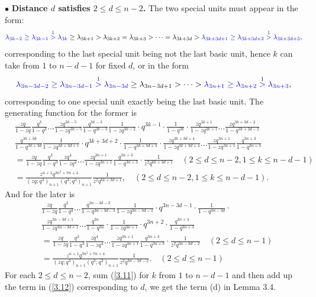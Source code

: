 \documentclass[draft]{amsart}
\numberwithin{equation}{section}
\theoremstyle{plain}
\theoremstyle{remark}
\begin{document}
 
$\bullet$ {\bf Distance $d$ satisfies  $2\leq d\leq n-2$.}
 The two special units must appear in the form:
$$
{\color{blue}\lambda_{3k-2}  \geq \lambda_{3k-1} \overset{1}{>} \lambda_{3k}} \geq  \lambda_{3k+1} > \lambda_{3k+2} = \lambda_{3k+3} > \dots=\lambda_{3k+3d}> {\color{blue}\lambda_{3k+3d+1}\geq\lambda_{3k+3d+2} \overset{1}{>} \lambda_{3k+3d+3}},
$$
corresponding to the last special unit  being not the last basic unit, hence $k$ can take from $1$ to $n-d-1$ for fixed $d$, or in the form
$$
{\color{blue}\lambda_{3n-3d-2}  \geq \lambda_{3n-3d-1} \overset{1}{>} \lambda_{3n-3d}} \geq  \lambda_{3n-3d+1} >\dots > {\color{blue} \lambda_{3n+1} \geq \lambda_{3n+2}\overset{1}{>}  \lambda_{3n+3}},
$$
corresponding to one special unit exactly being the last basic unit. The generating function for the former is
\begin{align}
 &\frac{zq}{1-zq}\frac{q^{3}}{1-q^{3}}\dots\frac{zq^{3k-5}}{1-zq^{3k-5}}\frac{q^{3k-3}}{1-q^{3k-3}}
 \frac{1}{1-zq^{3k-2}}\cdot q^{3k-1}\cdot\frac{1}{1-q^{3k}}\cdot
 \frac{zq^{3k+1}}{1-zq^{3k+1}}\dots\frac{zq^{3k+3d-2}}{1-q^{3k+3d-2}}\nonumber\\
 &\frac{q^{3k+3d}}{1-q^{3k+3d}}
 \frac{1}{1-zq^{3k+3d+1}}\cdot q^{3k+3d+2}\cdot\frac{1}{1-q^{3k+3d+3}}
\cdot\frac{zq^{3k+3d+4}}{1-zq^{3k+3d+4}}\dots\frac{zq^{3n+1}}{1-zq^{3n+1}}\frac{q^{3n+3}}{1-q^{3n+3}}\nonumber\\
&= \frac{zq}{1-zq}\frac{q^{3}}{1-q^{3}} \frac{zq^{4}}{1-zq^{4}}\dots\frac{zq^{3n+1}}{1-zq^{3n+1}} \frac{q^{3n+3}}{1-q^{3n+3}}\cdot\frac{1}{z^{2}q^{6k+3d+1}}  \quad (2 \leq d \leq n-2, 1\leq k \leq n-d-1)\nonumber\\
&=\frac{z^{n+1}q^{3n^{2}+7n+4}}{(zq;q^{3})_{n+1}(q^{3};q^{3})_{n+1}}\frac{1}{z^{2}q^{6k+3d+1}},              \quad(2\leq d\leq n-2,1\leq k\leq n-d-1).\label{3.11}
\end{align}
 And for the later is
\begin{align}
 &\frac{zq}{1-zq}\frac{q^{3}}{1-q^{3}}\dots\frac{q^{3n-3d-3}}{1-q^{3n-3d-3}}
 \frac{1}{1-zq^{3n-3d-2}}\cdot q^{3n-3d-1}\cdot\frac{1}{1-q^{3n-3d}}\cdot\nonumber\\
 &\frac{zq^{3n-3d+1}}{1-zq^{3n-3d+1}}\dots \frac{q^{3n}}{1-q^{3n}}\cdot\frac{1}{1-zq^{3n+1}}\cdot q^{3n+2}\cdot\frac{q^{3n+3}}{1-q^{3n+3}}\nonumber\\
&= \frac{zq}{1-zq}\frac{q^{3}}{1-q^{3}} \frac{zq^{4}}{1-zq^{4}}\dots\frac{zq^{3n+1}}{1-zq^{3n+1}} \frac{q^{3n+3}}{1-q^{3n+3}}\cdot\frac{1}{z^{2}q^{3n-3d-2}}  \quad( 2 \leq d \leq n-1)\nonumber\\
&=\frac{z^{n+1}q^{3n^{2}+7n+4}}{(zq;q^{3})_{n+1}(q^{3};q^{3})_{n+1}}\frac{1}{z^{2}q^{3n-3d-2}}. \quad(2 \leq d\leq n-1)\label{3.12}
\end{align}
For each $2\leq d\leq n-2$, sum (\ref{3.11}) for $k$ from $1$ to $n-d-1$ and then add up the term in (\ref{3.12}) corresponding to $d$, we get the term (d) in Lemma 3.4.
\end{document}
